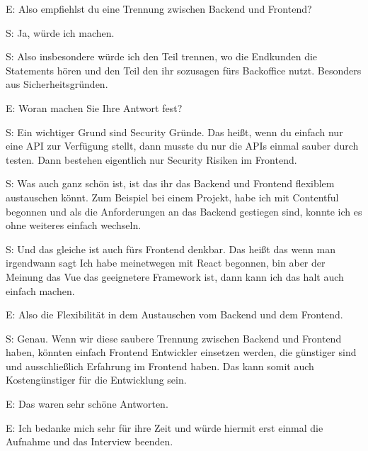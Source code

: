 E: Also empfiehlst du eine Trennung zwischen Backend und Frontend?

 \label{appendix:s-35}
S: Ja, würde ich machen.

 \label{appendix:s-36}
S: Also insbesondere würde ich den Teil trennen, wo die Endkunden die Statements hören und den Teil den ihr sozusagen fürs Backoffice nutzt. Besonders aus Sicherheitsgründen.

E: Woran machen Sie Ihre Antwort fest? 

 \label{appendix:s-37}
S: Ein wichtiger Grund sind Security Gründe. Das heißt, wenn du einfach nur eine API zur Verfügung stellt, dann musste du nur die APIs einmal sauber durch testen. Dann bestehen eigentlich nur Security Risiken im Frontend.

 \label{appendix:s-38}
S: Was auch ganz schön ist, ist das ihr das Backend und Frontend flexiblem austauschen könnt. Zum Beispiel bei einem Projekt, habe ich mit Contentful begonnen und als die Anforderungen an das Backend gestiegen sind, konnte ich es ohne weiteres einfach wechseln.

S: Und das gleiche ist auch fürs Frontend denkbar. Das heißt das wenn man irgendwann sagt Ich habe meinetwegen mit React begonnen, bin aber der Meinung das Vue das geeignetere Framework ist, dann kann ich das halt auch einfach machen.

E: Also die Flexibilität in dem Austauschen vom Backend und dem Frontend.

 \label{appendix:s-39}
S: Genau. Wenn wir diese saubere Trennung zwischen Backend und Frontend haben, könnten einfach Frontend Entwickler einsetzen werden, die günstiger sind und ausschließlich Erfahrung im Frontend haben. Das kann somit auch Kostengünstiger für die Entwicklung sein.

E: Das waren sehr schöne Antworten.

E: Ich bedanke mich sehr für ihre Zeit und würde hiermit erst einmal die Aufnahme und das Interview beenden.